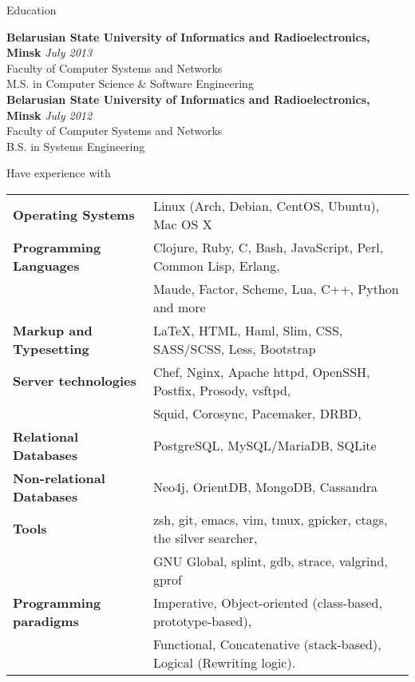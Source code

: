 \documentclass{resume} %
\begin{document}

\begin{rSection}{Education}

{\bf Belarusian State University of Informatics and Radioelectronics, Minsk} \hfill {\em July 2013} \\ 
Faculty of Computer Systems and Networks \\
M.S. in Computer Science \& Software Engineering \smallskip \\
{\bf Belarusian State University of Informatics and Radioelectronics, Minsk} \hfill {\em July 2012} \\ 
Faculty of Computer Systems and Networks \\
B.S. in Systems Engineering \\

\end{rSection}


\begin{rSection}{Have experience with}

\begin{tabular}{ @{} >{\bfseries}l @{\hspace{6ex}} l }
Operating Systems     & Linux (Arch, Debian, CentOS, Ubuntu), Mac OS X \smallskip \\
Programming Languages & Clojure, Ruby, C, Bash, JavaScript, Perl, Common Lisp, Erlang, \\
                      & Maude, Factor, Scheme, Lua, C++, Python and more\smallskip \\
Markup and Typesetting & \LaTeX, HTML, Haml, Slim, CSS, SASS/SCSS, Less, Bootstrap \smallskip \\
Server technologies   & Chef, Nginx, Apache httpd, OpenSSH, Postfix, Prosody, vsftpd,\\
                      & Squid, Corosync, Pacemaker, DRBD, \smallskip \\
Relational Databases & PostgreSQL, MySQL/MariaDB, SQLite \smallskip \\
Non-relational Databases & Neo4j, OrientDB, MongoDB, Cassandra \smallskip \\
Tools & zsh, git, emacs, vim, tmux, gpicker, ctags, the silver searcher, \\
      & GNU Global, splint, gdb, strace, valgrind, gprof \smallskip \\
Programming paradigms & Imperative, Object-oriented (class-based, prototype-based), \\
                      & Functional, Concatenative (stack-based), Logical (Rewriting logic).
\end{tabular}

\end{rSection}
\end{document}
